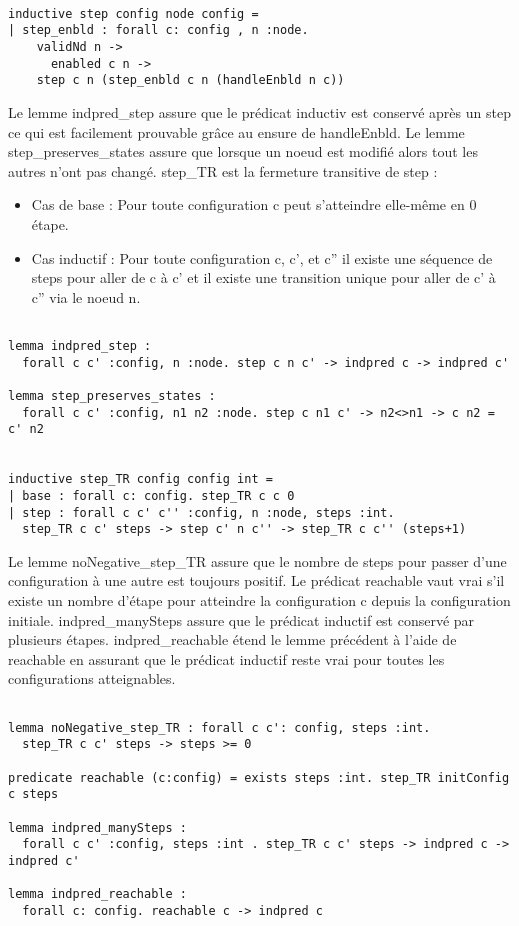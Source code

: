 \documentclass[11pt]{article}
\begin{document}
\lstset{language=why3,label= ,caption= ,captionpos=b,numbers=none}
\begin{lstlisting}

inductive step config node config =
| step_enbld : forall c: config , n :node.
    validNd n ->
      enabled c n ->
	step c n (step_enbld c n (handleEnbld n c))

\end{lstlisting}
Le lemme indpred\_step assure que le prédicat inductiv est conservé après un step ce qui est facilement prouvable grâce au ensure de handleEnbld.
Le lemme step\_preserves\_states assure que lorsque un noeud est modifié alors tout les autres n'ont pas changé. 
step\_TR est la fermeture transitive de step : 
\begin{itemize}
\item Cas de base : Pour toute configuration c peut s'atteindre elle-même en 0 étape.
\item Cas inductif : Pour toute configuration c, c', et c'' il existe une séquence de steps pour aller de c à c' et il existe une transition unique pour aller de c' à c'' via le noeud n.
\end{itemize}
\lstset{language=why3,label= ,caption= ,captionpos=b,numbers=none}
\begin{lstlisting}

lemma indpred_step :
  forall c c' :config, n :node. step c n c' -> indpred c -> indpred c'

lemma step_preserves_states :
  forall c c' :config, n1 n2 :node. step c n1 c' -> n2<>n1 -> c n2 = c' n2


inductive step_TR config config int =
| base : forall c: config. step_TR c c 0
| step : forall c c' c'' :config, n :node, steps :int.
  step_TR c c' steps -> step c' n c'' -> step_TR c c'' (steps+1)

\end{lstlisting}
Le lemme noNegative\_step\_TR assure que le nombre de steps pour passer d'une configuration à une autre est toujours positif.
Le prédicat reachable vaut vrai s'il existe un nombre d'étape pour atteindre la configuration c depuis la configuration initiale.
indpred\_manySteps assure que le prédicat inductif est conservé par plusieurs étapes.
indpred\_reachable étend le lemme précédent à l'aide de reachable en assurant que le prédicat inductif reste vrai pour toutes les configurations atteignables. 
\lstset{language=why3,label= ,caption= ,captionpos=b,numbers=none}
\begin{lstlisting}

lemma noNegative_step_TR : forall c c': config, steps :int.
  step_TR c c' steps -> steps >= 0

predicate reachable (c:config) = exists steps :int. step_TR initConfig c steps

lemma indpred_manySteps :
  forall c c' :config, steps :int . step_TR c c' steps -> indpred c -> indpred c'

lemma indpred_reachable :
  forall c: config. reachable c -> indpred c

\end{lstlisting}
\end{document}
